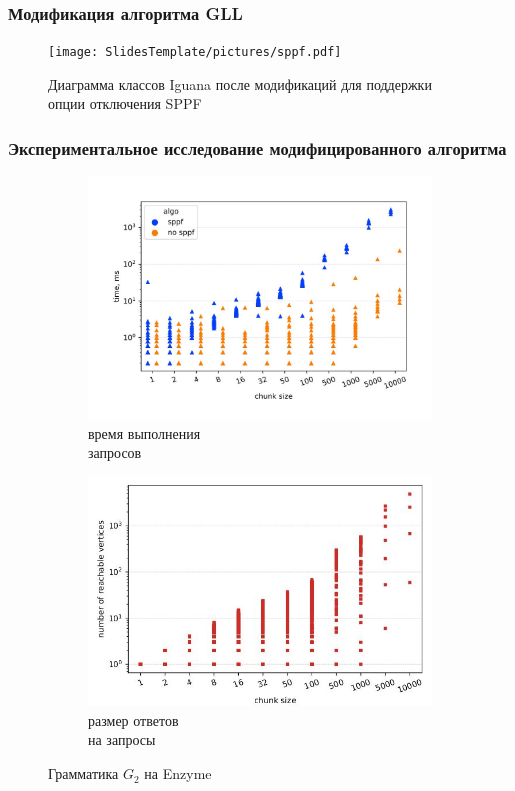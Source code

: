 \documentclass{beamer}
\begin{document}
\begin{frame}
\transwipe[direction=90]
 \frametitle{Модификация алгоритма GLL}
 \begin{figure}[H]
\centering
\texttt{[image: SlidesTemplate/pictures/sppf.pdf]}
\caption{Диаграмма классов Iguana после модификаций для поддержки опции отключения SPPF}
\label{fig:sppf}
\end{figure}
\end{frame}

\begin{frame}
\transwipe[direction=90]
 \frametitle{Экспериментальное исследование модифицированного алгоритма}
          \begin{figure}[H]
    \begin{subfigure}[b]{0.5\textwidth}
    \centering
    \includegraphics[width=\textwidth]{pictures/enzyme_sppf_subclass.pdf_1.jpg} \caption{время выполнения \\ запросов}
    \label{fig:subim1}
    \end{subfigure}%
    \begin{subfigure}[b]{0.5\textwidth}
    \centering
    \includegraphics[width=\columnwidth]{pictures/enzyme_subclass_ans_st.pdf_1.jpg} \caption{размер ответов \\ на запросы}
    \label{fig:subim2}
    \end{subfigure} \caption{Грамматика $G_2$ на Enzyme}
    \label{old_new2}
    \end{figure}
\end{frame}
\end{document}
